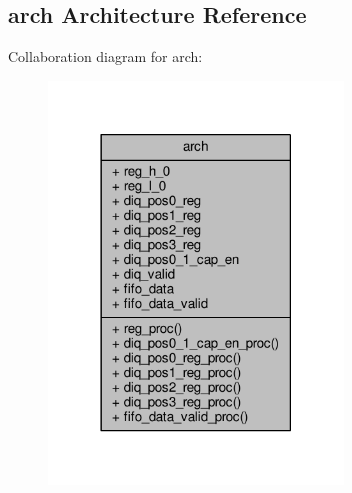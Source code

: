 \subsection{arch Architecture Reference}
\label{classrxiq__siso__ddr_1_1arch}


Collaboration diagram for arch\+:\nopagebreak
\begin{figure}[H]
\begin{center}
\leavevmode
\includegraphics[width=222pt]{d5/d85/classrxiq__siso__ddr_1_1arch__coll__graph}
\end{center}
\end{figure}

